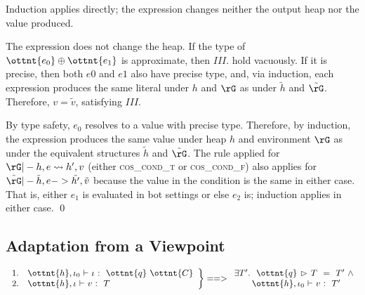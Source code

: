 
Induction applies directly; the expression changes neither the output heap nor
the value produced.


The expression does not change the heap. If the type of $\ottnt{e_{{\mathrm{0}}}}  \oplus  \ottnt{e_{{\mathrm{1}}}}$ is
approximate, then $III.$ hold vacuously. If it is precise, then both $e0$ and
$e1$ also have precise type, and, via induction, each expression produces the
same literal under $h$ and $\rG$ as under $\tilde{h}$ and $\tilde{\rG}$.
Therefore, $v = \tilde{v}$, satisfying $III.$


By type safety, $e_0$ resolves to a value with precise type. Therefore, by
induction, the expression produces the same value under heap $h$ and
environment $\rG$ as under the equivalent structures $\tilde{h}$ and
$\tilde{\rG}$. The rule applied for $\rG |- h, e \leadsto h', v$
(either \textsc{cos\_cond\_t} or \textsc{cos\_cond\_f})
also applies for 
$\tilde{\rG} |- \tilde{h}, e -> \tilde{h'}, \tilde{v}$ because the value in the
condition is the same in either case. That is, either $e_1$ is evaluated in bot
settings or else $e_2$ is; induction applies in either case.
\qed


\subsection{Adaptation from a Viewpoint}

\begin{lemma}
\label{lemma:comp}
\[
\left.
\begin{array}{ll}
1. &  \ottnt{h} ,  \iota_{{\mathrm{0}}} \  \textsf{$\vdash$} \  \iota \  \textsf{:} \ \    \ottnt{q} \  \ottnt{C}   \\
2. &  \ottnt{h} ,  \iota \  \textsf{$\vdash$} \  v \  \textsf{:} \ \  T \\
\end{array}
\right\} ==>
\begin{array}{l}
\exists T'.\ \ 
 \ottnt{q} \, \rhd\,  T \ \  \textsf{=} \ \  T' \ \wedge \\
\qquad
 \ottnt{h} ,  \iota_{{\mathrm{0}}} \  \textsf{$\vdash$} \  v \  \textsf{:} \ \  T' 
\end{array}
\]
\end{lemma}

